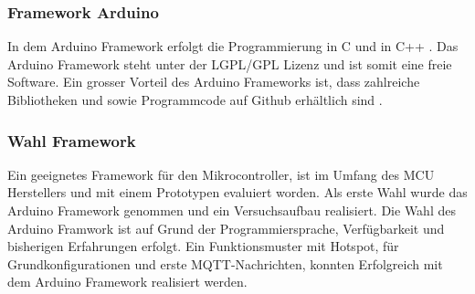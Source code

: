 \subsubsection{Framework Arduino}
In dem Arduino Framework erfolgt die Programmierung in C und in C++ . Das Arduino Framework steht unter der LGPL/GPL Lizenz und ist somit eine freie Software. Ein grosser Vorteil des Arduino Frameworks ist, dass zahlreiche Bibliotheken und sowie Programmcode auf  Github erhältlich sind \cite{noauthor_arduino_nodate}.

\subsubsection{Wahl Framework}
Ein geeignetes Framework für den Mikrocontroller, ist im Umfang des MCU Herstellers und mit einem Prototypen evaluiert worden. Als erste Wahl wurde das Arduino Framework genommen und ein Versuchsaufbau realisiert. Die Wahl des Arduino Framwork ist auf Grund der Programmiersprache, Verfügbarkeit und bisherigen Erfahrungen erfolgt. Ein Funktionsmuster mit Hotspot, für Grundkonfigurationen und erste MQTT-Nachrichten, konnten Erfolgreich mit dem Arduino Framework realisiert werden.

